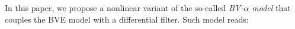 \documentclass[11pt,a4paper]{article}
\begin{document}


In this paper, we propose a nonlinear variant of the so-called \emph{BV-$\alpha$ model} \cite{Nadiga2001, Holm2003, Monteiro2015, Monteiro2014} that couples the BVE model with a differential filter. Such model reads:
\end{document}

